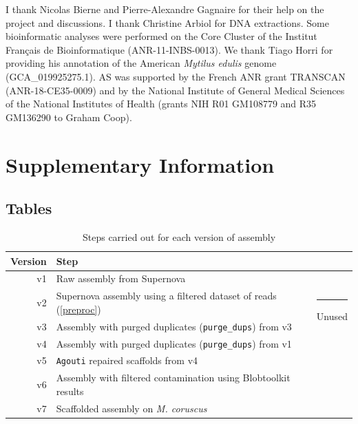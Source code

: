 \documentclass[11pt, a4paper]{article}
\begin{document}
I thank Nicolas Bierne and Pierre-Alexandre Gagnaire for their help on the project and discussions.
I thank Christine Arbiol for DNA extractions.
Some bioinformatic analyses were performed on the Core Cluster of the Institut Français de Bioinformatique (ANR-11-INBS-0013).
We thank Tiago Horri for providing his annotation of the American \textit{Mytilus edulis} genome (GCA\_019925275.1).
AS was supported by the French ANR grant TRANSCAN (ANR-18-CE35-0009) and by the National Institute of General Medical Sciences of the National Institutes of Health (grants NIH R01 GM108779 and R35 GM136290 to Graham Coop).

\printbibliography

\newpage
\appendix
\setcounter{table}{0}
\renewcommand{\thetable}{S\arabic{table}}
\setcounter{figure}{0}
\renewcommand{\thefigure}{S\arabic{figure}}
\section*{Supplementary Information}

\subsection*{Tables}

\begin{table}[h]
	\caption{Steps carried out for each version of assembly}
	\label{suptab:versions}
	\begin{tabular}{rll}
		Version & Step & \\ \toprule
		\rowcolor{gray!20}
		v1 & Raw assembly from Supernova & \\
		v2 & Supernova assembly using a filtered dataset of reads (\cref{preproc}) & \multirow{2}{*}{\rule{1pt}{25pt} Unused} \\
		v3 & Assembly with purged duplicates (\texttt{purge\_dups}) from v3 & \\
		\rowcolor{gray!20}
		v4 & Assembly with purged duplicates (\texttt{purge\_dups}) from v1 & \\
		\rowcolor{gray!20}
		v5 & \texttt{Agouti} repaired scaffolds from v4 & \\
		\rowcolor{gray!20}
		v6 & Assembly with filtered contamination using Blobtoolkit results & \\
		\rowcolor{gray!20}
		v7 & Scaffolded assembly on \textit{M. coruscus} & \\ \bottomrule
	\end{tabular}
\end{table}
\vspace{3em}
\end{document}
